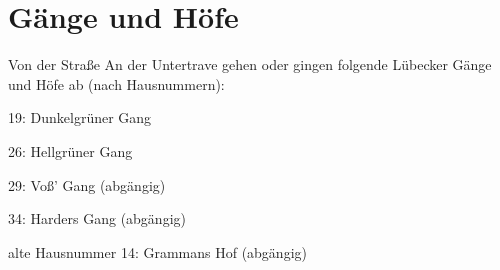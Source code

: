 
\chapter{Gänge und Höfe}
\label{chapter-gaengeundhoefe}

Von der Straße An der Untertrave gehen oder gingen folgende Lübecker Gänge und Höfe ab (nach Hausnummern): \cite{brehmer}

\begin{compactitem}
\item 19: Dunkelgrüner Gang
\item 26: Hellgrüner Gang
\item 29: Voß' Gang (abgängig)
\item 34: Harders Gang (abgängig)
\item alte Hausnummer 14: Grammans Hof (abgängig)
\end{compactitem}
